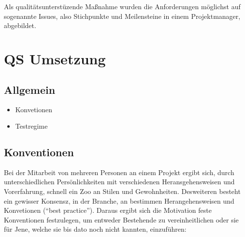 Als qualitätsunterstüzende Maßnahme wurden die Anforderungen möglichst auf sogenannte Issues, also Stichpunkte und Meilensteine in einem Projektmanager, abgebildet.
\section{QS Umsetzung}
\subsection{Allgemein}
\begin{itemize}
\item Konvetionen
\item Testregime
\end{itemize}
\subsection{Konventionen}
Bei der Mitarbeit von mehreren Personen an einem Projekt ergibt sich, durch unterschiedlichen Persönlichkeiten mit verschiedenen Heransgehensweisen und Vorerfahrung, schnell ein Zoo an Stilen und Gewohnheiten. Desweiteren besteht ein gewisser Konsensz, in der Branche, an bestimmen Herangehensweisen und Konvetionen ("`best practice"'). Daraus ergibt sich die Motivation feste Konventionen festzulegen, um entweder Bestehende zu vereinheitlichen oder sie für Jene, welche sie bis dato noch nicht kannten, einzuführen:
